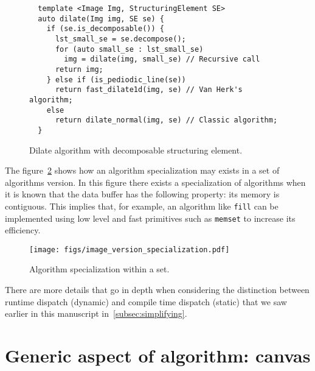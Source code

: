 \begin{figure}[tbh]
  \centering
  \begin{verbatim}
  template <Image Img, StructuringElement SE>
  auto dilate(Img img, SE se) {
    if (se.is_decomposable()) {
      lst_small_se = se.decompose();
      for (auto small_se : lst_small_se)
        img = dilate(img, small_se) // Recursive call
      return img;
    } else if (is_pediodic_line(se))
      return fast_dilate1d(img, se) // Van Herk's algorithm;
    else
      return dilate_normal(img, se) // Classic algorithm;
  }
  \end{verbatim}

  \caption{Dilate algorithm with decomposable structuring element.}
  \label{code:decomp.dilate}
\end{figure}

The figure~\ref{fig:image.specialization} shows how an algorithm specialization may exists in a set of algorithms
version. In this figure there exists a specialization of algorithms when it is known that the data buffer has the
following property: its memory is contiguous. This implies that, for example, an algorithm like \texttt{fill} can be
implemented using low level and fast primitives such as \texttt{memset} to increase its efficiency.

\begin{figure}[tbh]
  \centering
  \texttt{[image: figs/image\_version\_specialization.pdf]}
  \caption{Algorithm specialization within a set.}
  \label{fig:image.specialization}
\end{figure}

There are more details that go in depth when considering the distinction between runtime dispatch (dynamic) and
compile time dispatch (static) that we saw earlier in this manuscript in~\cref{subsec:simplifying}.


\section{Generic aspect of algorithm: canvas}
\label{sec:canvas}

